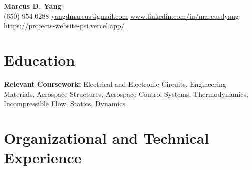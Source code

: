 \newcommand{\entrygap}{\vspace{2pt}}



\begin{center}
  {\fontsize{17}{20}\selectfont\bfseries Marcus D. Yang}\\[2pt]
  {\footnotesize (650) 954-0288 \textbar{} \href{mailto:yangdmarcus@gmail.com}{yangdmarcus@gmail.com} \textbar{} \href{https://www.linkedin.com/in/marcusdyang}{www.linkedin.com/in/marcusdyang} \textbar{} \href{https://projects-website-psi.vercel.app/}{https://projects-website-psi.vercel.app/}}
\end{center}

\section{Education}
\textbf{Relevant Coursework:} Electrical and Electronic Circuits, Engineering Materials, Aerospace Structures, Aerospace Control Systems, Thermodynamics, Incompressible Flow, Statics, Dynamics

\section{Organizational and Technical Experience}

